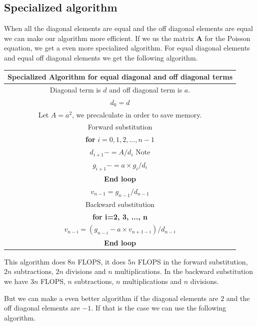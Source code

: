 \documentclass[10pt]{article}
\begin{document}
\subsection{Specialized algorithm}
When all the diagonal elements are equal and the off diagonal elements are equal we can make our algorithm more efficient. If we us the matrix $\mathbf{A}$ for the Poisson equation, we get a even more specialized algorithm. For equal diagonal elements and equal off diagonal elements we get the following algorithm.


\begin{center}
  \begin{tabular}{||c||}
    \hline\hline
    \textbf{Specialized Algorithm for equal diagonal and off diagonal terms}\\
    \hline\hline
    Diagonal term is $d$ and off diagonal term is $a$.\\
    $d_0=d$\\
    Let $A=a^2$, we precalculate in order to save memory.\\
    Forward substitution \\
    \textbf{for} $i=0,1,2,...,n-1$\\
      $d_{i+1}-=A/d_i$ Note \\
      $g_{i+1}-=a\times g_i/d_i$ \\
      \textbf{End loop} \\
      $v_{n-1}=g_{n-1}/d_{n-1}$\\
      Backward substitution \\
      \textbf{for i=2, 3, ..., n} \\
      $v_{n-i}=(g_{n-i}-a\times v_{n+1-i})/d_{n-i}$\\ 
      \textbf{End loop}\\
      \hline\hline
  \end{tabular}
\end{center}

This algorithm does $8n$ FLOPS, it does $5n$ FLOPS in the forward substitution, $2n$ subtractions, $2n$ divisions and $n$ multiplications. In the backward substitution we have $3n$ FLOPS, $n$ subtractions, $n$ multiplications and $n$ divisions.

But we can make a even better algorithm if the diagonal elements are $2$ and the off diagonal elements are $-1$. If that is the case we can use the following algorithm.
\end{document}

